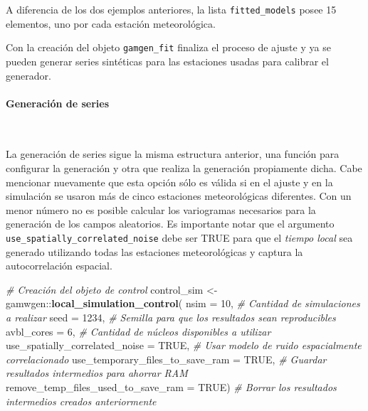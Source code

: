 \documentclass[
  12pt]{article}
\newenvironment{Shaded}{}{}
\newcommand{\CommentTok}[1]{\textcolor[rgb]{0.38,0.63,0.69}{\textit{#1}}}
\newcommand{\DataTypeTok}[1]{\textcolor[rgb]{0.56,0.13,0.00}{#1}}
\newcommand{\DecValTok}[1]{\textcolor[rgb]{0.25,0.63,0.44}{#1}}
\newcommand{\KeywordTok}[1]{\textcolor[rgb]{0.00,0.44,0.13}{\textbf{#1}}}
\newcommand{\NormalTok}[1]{#1}
\newcommand{\OperatorTok}[1]{\textcolor[rgb]{0.40,0.40,0.40}{#1}}
\newcommand{\OtherTok}[1]{\textcolor[rgb]{0.00,0.44,0.13}{#1}}
\newcommand{\StringTok}[1]{\textcolor[rgb]{0.25,0.44,0.63}{#1}}
\begin{document}
A diferencia de los dos ejemplos anteriores, la lista \texttt{fitted\_models} posee 15 elementos, uno por cada estación meteorológica.

Con la creación del objeto \texttt{gamgen\_fit} finaliza el proceso de ajuste y ya se pueden generar series sintéticas para las estaciones usadas para calibrar el generador.

\hypertarget{generaciuxf3n-de-series-2}{%
\paragraph{Generación de series}\label{generaciuxf3n-de-series-2}}

~

La generación de series sigue la misma estructura anterior, una función para configurar la generación y otra que realiza la generación propiamente dicha. Cabe mencionar nuevamente que esta opción sólo es válida si en el ajuste y en la simulación se usaron más de cinco estaciones meteorológicas diferentes. Con un menor número no es posible calcular los variogramas necesarios para la generación de los campos aleatorios. Es importante notar que el argumento \texttt{use\_spatially\_correlated\_noise} debe ser TRUE para que el \emph{tiempo local} sea generado utilizando todas las estaciones meteorológicas y captura la autocorrelación espacial.

\begin{Shaded}
\begin{Highlighting}[]
\CommentTok{# Creación del objeto de control}
\NormalTok{control_sim <-}\StringTok{ }\NormalTok{gamwgen}\OperatorTok{::}\KeywordTok{local_simulation_control}\NormalTok{(}
  \DataTypeTok{nsim =} \DecValTok{10}\NormalTok{, }
  \CommentTok{# Cantidad de simulaciones a realizar}
  \DataTypeTok{seed =} \DecValTok{1234}\NormalTok{, }
  \CommentTok{# Semilla para que los resultados sean reproducibles}
  \DataTypeTok{avbl_cores =} \DecValTok{6}\NormalTok{, }
  \CommentTok{# Cantidad de núcleos disponibles a utilizar}
  \DataTypeTok{use_spatially_correlated_noise =} \OtherTok{TRUE}\NormalTok{, }
  \CommentTok{# Usar modelo de ruido espacialmente correlacionado}
  \DataTypeTok{use_temporary_files_to_save_ram =} \OtherTok{TRUE}\NormalTok{, }
  \CommentTok{# Guardar resultados intermedios para ahorrar RAM}
  \DataTypeTok{remove_temp_files_used_to_save_ram =} \OtherTok{TRUE}\NormalTok{) }
  \CommentTok{# Borrar los resultados intermedios creados anteriormente}
\end{Highlighting}
\end{Shaded}
\end{document}
